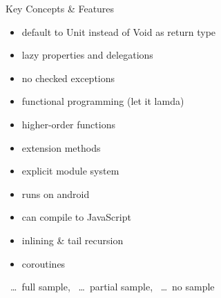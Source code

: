 \begin{frame}{Key Concepts \& Features}
	\begin{itemize}
		\item default to Unit instead of Void as return type \xmark 
		\item lazy properties and delegations \cmark
		\item no checked exceptions \xmark
		\item functional programming (let it lamda) \tmark
		\item higher-order functions \tmark
		\item extension methods \cmark
		\item explicit module system \xmark
		\item runs on android \xmark
		\item can compile to JavaScript \xmark
		\item inlining \& tail recursion \xmark
		\item coroutines \tmark
	\end{itemize}
\cmark\ \dots\ full sample, \tmark\ \dots\ partial sample, \xmark\ \dots\ no sample
\end{frame}

